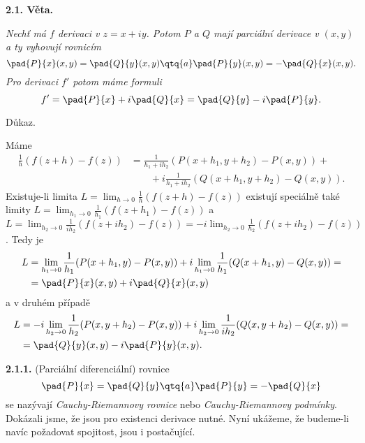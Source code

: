 \documentclass[12pt]{article}
\begin{document}
 {\bf 2.1. Věta.} {\em Nechť má $f$ derivaci v $z=x+iy$. Potom $P$ a $Q$ mají parciální derivace v $(x,y)$ a ty vyhovují rovnicím
 $$
 \pad{P}{x}(x,y)=\pad{Q}{y}(x,y)\qtq{a}\pad{P}{y}(x,y)=-\pad{Q}{x}(x,y).
 $$
 Pro derivaci $f'$ potom máme formuli
 $$
 f'=\pad{P}{x}+i\pad{Q}{x}=\pad{Q}{y}-i\pad{P}{y}.
 $$
 
 Důkaz.} Máme
 $$
 \begin{aligned}
 \frac1h(f(z+h)-f(z))& =\frac1{h_1+ih_2}(P(x+h_1,y+h_2)-P(x,y))+\\
 &\quad\quad +i\frac{1}{h_1+ih_2}(Q(x+h_1,y+h_2)-Q(x,y)).
 \end{aligned}
 $$
Existuje-li limita $L=\lim_{h\to 0}\frac1h(f(z+h)-f(z))$ existují speciálně také limity
 $L=\lim_{h_1\to 0}\frac1{h_1}(f(z+h_1)-f(z))$ a $L=\lim_{h_2\to 0}\frac1{ih_2}(f(z+ih_2)-f(z))
 =-i\lim_{h_2\to 0}\frac1{h_2}(f(z+ih_2)-f(z))$. Tedy je
 $$
 \begin{aligned}
 L&=\lim_{h_1\to 0}\frac1{h_1}(P(x+h_1,y)-P(x,y))+i\lim_{h_1\to 0}\frac1{h_1}(Q(x+h_1,y)-Q(x,y))=\\
  &=\pad{P}{x}(x,y)+i\pad{Q}{x}(x,y)
  \end{aligned}
  $$ 
  a v druhém případě
  $$
 \begin{aligned}
 L&=-i\lim_{h_2\to 0}\frac1{h_2}(P(x,y+h_2)-P(x,y))+i\lim_{h_2\to 0}\frac1{ih_2}(Q(x,y+h_2)-Q(x,y))=\\
  &=\pad{Q}{y}(x,y)-i\pad{P}{y}(x,y).
  \end{aligned}
  $$ \sq
  
  \medskip
  
  {\bf 2.1.1.}  (Parciální diferenciální) rovnice
  $$
 \pad{P}{x}=\pad{Q}{y}\qtq{a}\pad{P}{y}=-\pad{Q}{x}
 $$
se nazývají {\em Cauchy-Riemannovy rovnice} nebo  {\em Cauchy-Riemannovy podmínky}. Dokázali jsme, že jsou pro existenci derivace nutné. Nyní ukážeme, že  budeme-li navíc požadovat spojitost, jsou i postačující. 
 
 \bigskip
 
\end{document}
